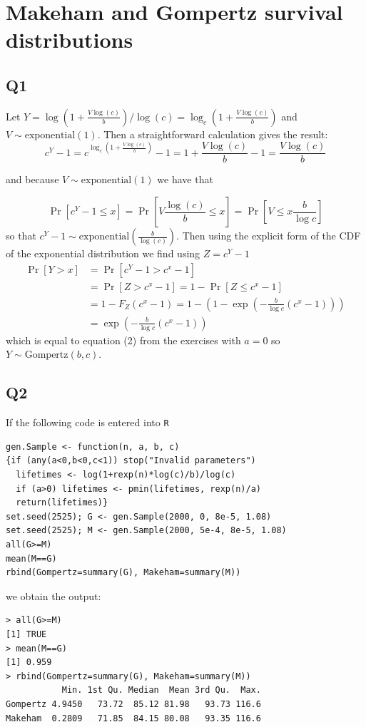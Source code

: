
\section*{Makeham and Gompertz survival distributions}

\subsection*{Q1}

Let $Y = \log(1+\frac{V \log(c)}{b}) / \log(c) = \log_c(1+\frac{V \log(c)}{b})$ and $V \sim \text{exponential}(1)$. Then a straightforward calculation gives the result:
\begin{equation}
c^Y - 1 = c^{ \log_c(1+\frac{V \log(c)}{b})} - 1 = 1+\frac{V\log(c)}{b} - 1 = \frac{V \log(c)}{b}
\end{equation}

and because $V \sim \text{exponential}(1)$ we have that

\begin{equation}
\Pr[c^Y - 1 \le x ] = \Pr[V \frac{\log(c)}{b} \le x ] = \Pr[V \le x \frac{b}{\log{c}}] 
\end{equation}
so that $c^Y - 1 \sim \text{exponential}( \frac{b}{\log(c)})$. Then using the explicit form of the CDF of the exponential distribution we find using $Z = c^Y - 1 $
\begin{equation}
\begin{split}
\Pr[Y > x] & = \Pr[c^Y - 1 > c^x - 1] \\ 
		 & = \Pr[Z > c^x - 1] = 1- \Pr[Z \le c^x - 1]  \\
		 & = 1 - F_Z(c^x - 1) = 1 - (1-\exp(-\frac{b}{\log c} (c^x - 1))) \\
	     & = \exp(-\frac{b}{\log c} (c^x - 1))
\end{split}
\end{equation}
which is equal to equation (2) from the exercises with $a = 0$ so $ Y \sim \text{Gompertz}(b,c)$.

\subsection*{Q2}
If the following code is entered into \verb|R|
\begin{verbatim}
gen.Sample <- function(n, a, b, c)
{if (any(a<0,b<0,c<1)) stop("Invalid parameters")
  lifetimes <- log(1+rexp(n)*log(c)/b)/log(c)
  if (a>0) lifetimes <- pmin(lifetimes, rexp(n)/a)
  return(lifetimes)}
set.seed(2525); G <- gen.Sample(2000, 0, 8e-5, 1.08)
set.seed(2525); M <- gen.Sample(2000, 5e-4, 8e-5, 1.08)
all(G>=M) 
mean(M==G) 
rbind(Gompertz=summary(G), Makeham=summary(M))
\end{verbatim}
we obtain the output:
\begin{verbatim}
> all(G>=M) 
[1] TRUE
> mean(M==G) 
[1] 0.959
> rbind(Gompertz=summary(G), Makeham=summary(M))
           Min. 1st Qu. Median  Mean 3rd Qu.  Max.
Gompertz 4.9450   73.72  85.12 81.98   93.73 116.6
Makeham  0.2809   71.85  84.15 80.08   93.35 116.6
\end{verbatim}

